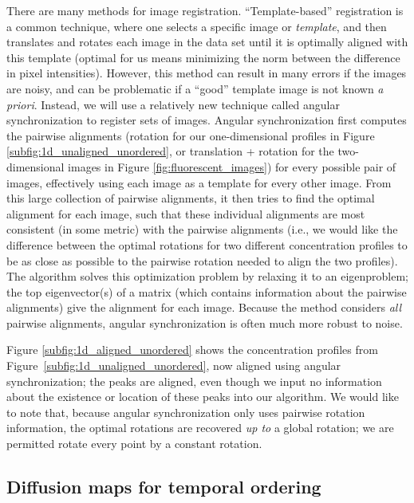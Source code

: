 \documentclass{pnastwo}
\begin{document}
\begin{article}
There are many methods for image registration. 
%
``Template-based'' registration \cite{ahuja2007template} is a common technique, where one selects a specific image or {\em template}, and then translates and rotates each image in the data set until it is optimally aligned with this template (optimal for us means minimizing the norm between the difference in pixel intensities).
%
However, this method can result in many errors if the images are noisy, and can be problematic if a ``good'' template image is not known {\em a priori}. 
%
Instead, we will use a relatively new technique called angular synchronization\cite{singer2011angular} to register sets of images.
%
Angular synchronization first computes the pairwise alignments (rotation for our one-dimensional profiles in Figure \ref{subfig:1d_unaligned_unordered}, or translation + rotation for the two-dimensional images in Figure \ref{fig:fluorescent_images}) for every possible pair of images, effectively using each image as a template for every other image.
%
From this large collection of pairwise alignments, it then tries to find the optimal alignment for each image, such that these individual alignments are most consistent (in some metric) with the pairwise alignments (i.e., we would like the difference between the optimal rotations for two different concentration profiles to be as close as possible to the pairwise rotation needed to align the two profiles).
%
The algorithm solves this optimization problem by relaxing it to an eigenproblem; the top eigenvector(s) of a matrix (which contains information about the pairwise alignments) give the alignment for each image.
%
Because the method considers {\em all} pairwise alignments, angular synchronization is often much more robust to noise. 

Figure \ref{subfig:1d_aligned_unordered} shows the concentration profiles from Figure~\ref{subfig:1d_unaligned_unordered}, now aligned using angular synchronization;
the peaks are aligned, even though we input no information about the existence or location of these peaks into our algorithm.
%
We would like to note that, because angular synchronization only uses pairwise rotation information, the optimal rotations are recovered {\em up to} a global rotation; we are permitted rotate every point by a constant rotation.

\subsection{Diffusion maps for temporal ordering}


\end{article}
\end{document}
